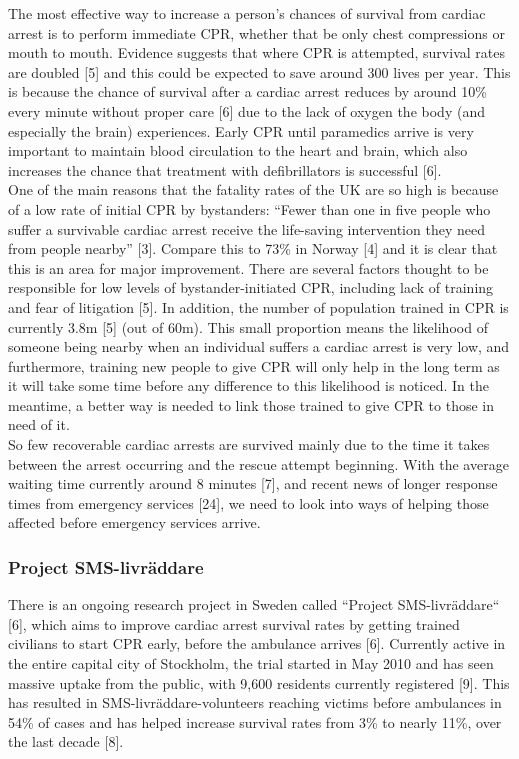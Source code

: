 \documentclass[]{article}
\begin{document}
The most effective way to increase a person’s chances of survival from cardiac arrest is to perform immediate CPR, whether that be only chest compressions or mouth to mouth. Evidence suggests that where CPR is attempted, survival rates are doubled [5] and this could be expected to save around 300 lives per year. This is because the chance of survival after a cardiac arrest reduces by around 10\% every minute without proper care [6] due to the lack of oxygen the body (and especially the brain) experiences. Early CPR until paramedics arrive is very important to maintain blood circulation to the heart and brain, which also increases the chance that treatment with defibrillators is successful [6].\\

One of the main reasons that the fatality rates of the UK are so high is because of a low rate of initial CPR by bystanders: “Fewer than one in five people who suffer a survivable cardiac arrest receive the life-saving intervention they need from people nearby” [3]. Compare this to 73\% in Norway [4] and it is clear that this is an area for major improvement. There are several factors thought to be responsible for low levels of bystander-initiated CPR, including lack of training and fear of litigation [5]. In addition, the number of population trained in CPR is currently 3.8m [5] (out of 60m). This small proportion means the likelihood of someone being nearby when an individual suffers a cardiac arrest is very low, and furthermore, training new people to give CPR will only help in the long term as it will take some time before any difference to this likelihood is noticed. In the meantime, a better way is needed to link those trained to give CPR to those in need of it.\\

So few recoverable cardiac arrests are survived mainly due to the time it takes between the arrest occurring and the rescue attempt beginning. With the average waiting time currently around 8 minutes [7], and recent news of longer response times from emergency services [24], we need to look into ways of helping those affected before emergency services arrive.\\
		\subsubsection{Project SMS-livräddare}
		
		There is an ongoing research project in Sweden called “Project SMS-livräddare“ [6], which aims to improve cardiac arrest survival rates by getting trained civilians to start CPR early, before the ambulance arrives [6]. Currently active in the entire capital city of Stockholm, the trial started in May 2010 and has seen massive uptake from the public, with 9,600 residents currently registered [9]. This has resulted in SMS-livräddare-volunteers reaching victims before ambulances in 54\% of cases and has helped increase survival rates from 3\% to nearly 11\%, over the last decade [8].\\
\end{document}
